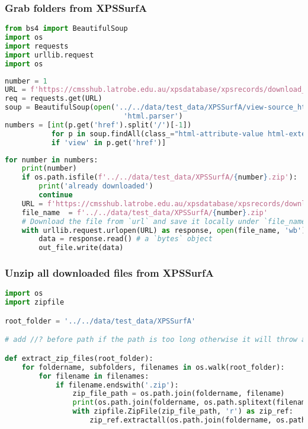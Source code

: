 \subsubsection{Grab folders from XPSSurfA}\label{grab-folders-from-xpssurfa}

\begin{lstlisting}[language=Python]
from bs4 import BeautifulSoup
import os
import requests
import urllib.request
import os
\end{lstlisting}

\begin{lstlisting}[language=Python]
number = 1
URL = f'https://cmsshub.latrobe.edu.au/xpsdatabase/xpsrecords/download_data_files/{number}'
req = requests.get(URL)
soup = BeautifulSoup(open('../../data/test_data/XPSSurfA/view-source_https___cmsshub.latrobe.edu.au_xpsdatabase_xpsrecords.html'),
                            'html.parser')
numbers = [int(p.get('href').split('/')[-1]) 
           for p in soup.findAll(class_="html-attribute-value html-external-link") 
           if 'view' in p.get('href')]
\end{lstlisting}

\begin{lstlisting}[language=Python]
for number in numbers:
    print(number)
    if os.path.isfile(f'../../data/test_data/XPSSurfA/{number}.zip'):
        print('already downloaded')
        continue
    URL = f'https://cmsshub.latrobe.edu.au/xpsdatabase/xpsrecords/download_data_files/{number}'
    file_name  = f'../../data/test_data/XPSSurfA/{number}.zip'
    # Download the file from `url` and save it locally under `file_name`:
    with urllib.request.urlopen(URL) as response, open(file_name, 'wb') as out_file:
        data = response.read() # a `bytes` object
        out_file.write(data)
\end{lstlisting}

\subsubsection{Unzip all downloaded files from
XPSSurfA}\label{unzip-all-downloaded-files-from-xpslibrary.com}

\begin{lstlisting}[language=Python]
import os
import zipfile

root_folder = '../../data/test_data/XPSSurfA'

# add //? before path if the path is too long otherwise it will throw an error

def extract_zip_files(root_folder):
    for foldername, subfolders, filenames in os.walk(root_folder):
        for filename in filenames:
            if filename.endswith('.zip'):
                zip_file_path = os.path.join(foldername, filename)
                print(os.path.join(foldername, os.path.splitext(filename)[0]))
                with zipfile.ZipFile(zip_file_path, 'r') as zip_ref:
                    zip_ref.extractall(os.path.join(foldername, os.path.splitext(filename)[0]))
\end{lstlisting}

